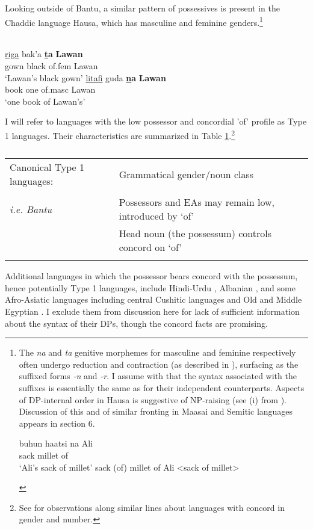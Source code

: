 \documentclass[output=paper
,modfonts
,nonflat]{langsci/langscibook}
\begin{document}
Looking outside of Bantu, a similar pattern of possessives is present in the Chaddic language Hausa, which has masculine and feminine genders.\footnote{The \textit{na} and \textit{ta} genitive morphemes for masculine and feminine respectively often undergo reduction and contraction (as described in \citealt{Tuller1986}), surfacing as the suffixed forms \textit{-n} and \textit{-r}. I assume with \citet{Tuller1986} that the syntax associated with the suffixes is essentially the same as for their independent counterparts. Aspects of DP-internal order in Hausa is suggestive of NP-raising (see (i) from \citealt[30]{Tuller1986}). Discussion of this and of similar fronting in Maasai and Semitic languages appears in section 6.
\begin{exe}
	\ex 
	\xlist
	\ex 
	\gll buhun haatsi na Ali\\
	sack     millet  of\\
	\glt `Ali's sack of millet'  	
	\ex {\lbrack}sack (of) millet{\rbrack} of Ali <sack of millet>
	
	\endxlist
\end{exe}}

\begin{exe}
	\ex \citep[301]{Newmann2000}\\
	\xlist
	\ex 
	\gll \underline{riga}   bak’a   \textbf{\underline{t}a}       \textbf{Lawan} \\
	gown   black   of.fem    Lawan\\
	\glt `Lawan’s black gown'  	
	\ex 
	\gll \underline{litafi}     guda \textbf{\underline{n}a}       \textbf{Lawan}\\
	book one  of.masc  Lawan\\
	\glt `one book of Lawan's'
	\endxlist
\end{exe}
I will refer to languages with the low possessor and concordial 'of' profile as Type 1 languages. Their characteristics are summarized in Table \ref{tab:1}.\footnote{See \citealt{Giusti2008} for observations along similar lines about languages with concord in gender and number.} 
\begin{table}
	\caption{}
	\label{tab:1}
	\begin{tabularx}{\textwidth}{lX}
		\lsptoprule
		Canonical Type 1 languages: & Grammatical gender/noun class\\ \\
		\textit{i.e. Bantu} & Possessors and EAs may remain low, introduced by ‘of’\\
		& Head noun (the possessum) controls concord on ‘of’\\
		\lspbottomrule
	\end{tabularx}
\end{table} \newpage \noindent
Additional languages in which the possessor bears concord with the possessum, hence potentially Type 1 languages, include Hindi-Urdu \citep{Bogel_Butt2013}, Albanian \citep{Spencer2007}, and some Afro-Asiatic languages including central Cushitic languages \citep{Hetzron1995} and Old and Middle Egyptian \citep{Haspelmath2015}. I exclude them from discussion here for lack of sufficient information about the syntax of their DPs, though the concord facts are promising.
\end{document}
